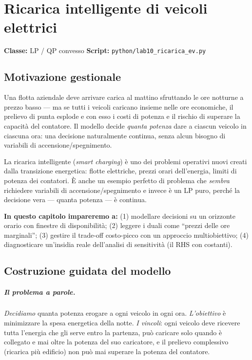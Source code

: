 \chapter{Ricarica intelligente di veicoli elettrici}
\label{cap:ricaricaev}

\noindent\textbf{Classe:} LP / QP convesso \hfill
\textbf{Script:} \texttt{python/lab10\_ricarica\_ev.py}

\section{Motivazione gestionale}

Una flotta aziendale deve arrivare carica al mattino sfruttando le ore notturne a
prezzo basso --- ma se tutti i veicoli caricano insieme nelle ore economiche, il
prelievo di punta esplode e con esso i costi di potenza e il rischio di superare la
capacità del contatore. Il modello decide \emph{quanta potenza} dare a ciascun veicolo
in ciascuna ora: una decisione naturalmente continua, senza alcun bisogno di variabili
di accensione/spegnimento.



La ricarica intelligente (\emph{smart charging}) è uno dei problemi operativi nuovi
creati dalla transizione energetica: flotte elettriche, prezzi orari dell'energia,
limiti di potenza dei contatori. È anche un esempio perfetto di problema che
\emph{sembra} richiedere variabili di accensione/spegnimento e invece è un LP puro,
perché la decisione vera --- quanta potenza --- è continua.

\textbf{In questo capitolo impareremo a:} (1) modellare decisioni su un orizzonte
orario con finestre di disponibilità; (2) leggere i duali come ``prezzi delle ore
marginali''; (3) gestire il trade-off costo-picco con un approccio multiobiettivo;
(4) diagnosticare un'insidia reale dell'analisi di sensitività (il RHS con
costanti).

\section{Costruzione guidata del modello}

\paragraph{Il problema a parole.} \emph{Decidiamo} quanta potenza erogare a ogni
veicolo in ogni ora. \emph{L'obiettivo} è minimizzare la spesa energetica della
notte. \emph{I vincoli}: ogni veicolo deve ricevere tutta l'energia che gli serve
entro la partenza, può caricare solo quando è collegato e mai oltre la potenza del
suo caricatore, e il prelievo complessivo (ricarica più edificio) non può mai
superare la potenza del contatore.

